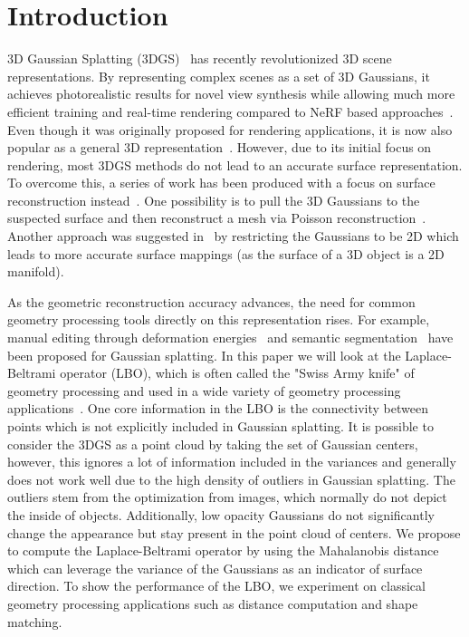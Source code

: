 \section{Introduction}
\label{sec:intro}

3D Gaussian Splatting (3DGS)~\cite{kerbl3Dgaussians} has recently revolutionized 3D scene representations. By representing complex scenes as a set of 3D Gaussians, it achieves photorealistic results for novel view synthesis while allowing much more efficient training and real-time rendering compared to NeRF based approaches~\cite{barron2022mip}. 
Even though it was originally proposed for rendering applications, it is now also popular as a general 3D representation~\cite{Huang2DGS2024,GaoMeshGaussian2024}. 
However, due to its initial focus on rendering, most 3DGS methods do not lead to an accurate surface representation. 
To overcome this, a series of work has been produced with a focus on surface reconstruction instead~\cite{Huang2DGS2024,chen2023neusgneuralimplicitsurface}. 
One possibility is to pull the 3D Gaussians to the suspected surface and then reconstruct a mesh via Poisson reconstruction~\cite{guedon2023sugar,kazhdan2006poisson}.
Another approach was suggested in~\cite{Huang2DGS2024} by restricting the Gaussians to be 2D which leads to more accurate surface mappings (as the surface of a 3D object is a 2D manifold). 

As the geometric reconstruction accuracy advances, the need for common geometry processing tools directly on this representation rises.
For example, manual editing through deformation energies~\cite{huang2024sc} and semantic segmentation~\cite{cen2023saga} have been proposed for Gaussian splatting.
In this paper we will look at the Laplace-Beltrami operator (LBO), which is often called the "Swiss Army knife" of geometry processing and used in a wide variety of geometry processing applications~\cite{sorkine2005laplacian,ovsjanikov2012functional,weber2024finsler}. 
One core information in the LBO is the connectivity between points which is not explicitly included in Gaussian splatting. 
It is possible to consider the 3DGS as a point cloud by taking the set of Gaussian centers,
however, this ignores a lot of information included in the variances and generally does not work well due to the high density of outliers in Gaussian splatting. 
The outliers stem from the optimization from images, which normally do not depict the inside of objects.
Additionally, low opacity Gaussians do not significantly change the appearance but stay present in the point cloud of centers.
We propose to compute the Laplace-Beltrami operator by using the Mahalanobis distance which can leverage the variance of the Gaussians as an indicator of surface direction. 
To show the performance of the LBO, we experiment on classical geometry processing applications such as distance computation and shape matching.


